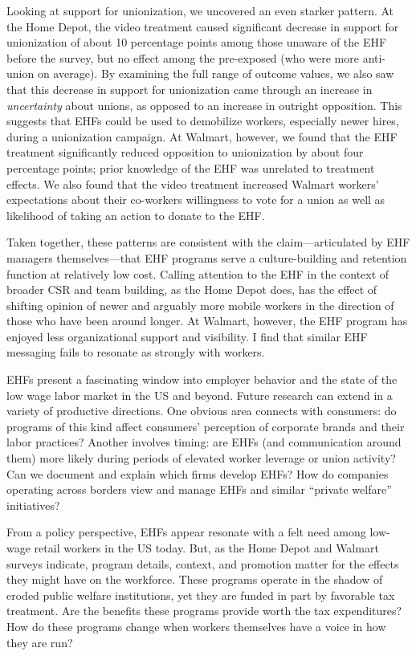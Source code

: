 \documentclass[
  11pt,
  oneside]{article}
\begin{document}
Looking at support for unionization, we uncovered an even starker pattern. At the Home Depot, the video treatment caused significant decrease in support for unionization of about 10 percentage points among those unaware of the EHF before the survey, but no effect among the pre-exposed (who were more anti-union on average). By examining the full range of outcome values, we also saw that this decrease in support for unionization came through an increase in \emph{uncertainty} about unions, as opposed to an increase in outright opposition. This suggests that EHFs could be used to demobilize workers, especially newer hires, during a unionization campaign. At Walmart, however, we found that the EHF treatment significantly reduced opposition to unionization by about four percentage points; prior knowledge of the EHF was unrelated to treatment effects. We also found that the video treatment increased Walmart workers' expectations about their co-workers willingness to vote for a union as well as likelihood of taking an action to donate to the EHF.

Taken together, these patterns are consistent with the claim---articulated by EHF managers themselves---that EHF programs serve a culture-building and retention function at relatively low cost. Calling attention to the EHF in the context of broader CSR and team building, as the Home Depot does, has the effect of shifting opinion of newer and arguably more mobile workers in the direction of those who have been around longer. At Walmart, however, the EHF program has enjoyed less organizational support and visibility. I find that similar EHF messaging fails to resonate as strongly with workers.

EHFs present a fascinating window into employer behavior and the state of the low wage labor market in the US and beyond. Future research can extend in a variety of productive directions. One obvious area connects with consumers: do programs of this kind affect consumers' perception of corporate brands and their labor practices? Another involves timing: are EHFs (and communication around them) more likely during periods of elevated worker leverage or union activity? Can we document and explain which firms develop EHFs? How do companies operating across borders view and manage EHFs and similar ``private welfare'' initiatives?

From a policy perspective, EHFs appear resonate with a felt need among low-wage retail workers in the US today. But, as the Home Depot and Walmart surveys indicate, program details, context, and promotion matter for the effects they might have on the workforce. These programs operate in the shadow of eroded public welfare institutions, yet they are funded in part by favorable tax treatment. Are the benefits these programs provide worth the tax expenditures? How do these programs change when workers themselves have a voice in how they are run?
\end{document}
